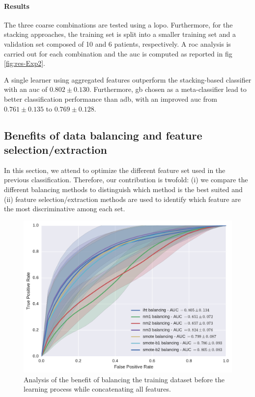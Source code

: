 \paragraph{Results}
The three coarse combinations are tested using a \ac{lopo}.
Furthermore, for the stacking approaches, the training set is split into a smaller training set and a validation set composed of 10 and 6 patients, respectively.
A \ac{roc} analysis is carried out for each combination and the \ac{auc} is computed as reported in \acs{fig}\,\ref{fig:res-Exp2}.

A single learner using aggregated features outperform the stacking-based classifier with an \ac{auc} of $0.802 \pm 0.130$.
Furthermore, \ac{gb} chosen as a meta-classifier lead to better classification performance than \ac{adb}, with an improved \ac{auc} from $0.761 \pm 0.135$ to $0.769 \pm 0.128$.

\subsection{Benefits of data balancing and feature selection/extraction}\label{subsec:chp6:exp-res:Ex3}

In this section, we attend to optimize the different feature set used in the previous classification.
Therefore, our contribution is twofold: (i) we compare the different balancing methods to distinguish which method is the best suited and (ii) feature selection/extraction methods are used to identify which feature are the most discriminative among each set.

\begin{figure}
  \centering
  \includegraphics[width=0.7\linewidth]{6_pipeline/figures/exp-3/all.pdf}
  \caption{Analysis of the benefit of balancing the training dataset before the learning process while concatenating all features.}
  \label{fig:allbalance}
\end{figure}

